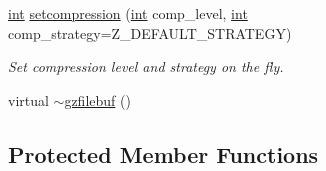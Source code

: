 \begin{DoxyCompactItemize}
\hyperlink{lp__lib_8h_adeb9ec6400320e4923ac9d836d509ddb}{int} \hyperlink{classgzfilebuf_ad109ea4fc4ca7cc19d8014b53375255d}{setcompression} (\hyperlink{lp__lib_8h_adeb9ec6400320e4923ac9d836d509ddb}{int} comp\+\_\+level, \hyperlink{lp__lib_8h_adeb9ec6400320e4923ac9d836d509ddb}{int} comp\+\_\+strategy=Z\+\_\+\+D\+E\+F\+A\+U\+L\+T\+\_\+\+S\+T\+R\+A\+T\+E\+GY)
\begin{DoxyCompactList}\small\item\em Set compression level and strategy on the fly. \end{DoxyCompactList}\item 
virtual \hyperlink{classgzfilebuf_acb95da35cfe68e16fc85cac62453451d}{$\sim$gzfilebuf} ()
\end{DoxyCompactItemize}
\subsection*{Protected Member Functions}

